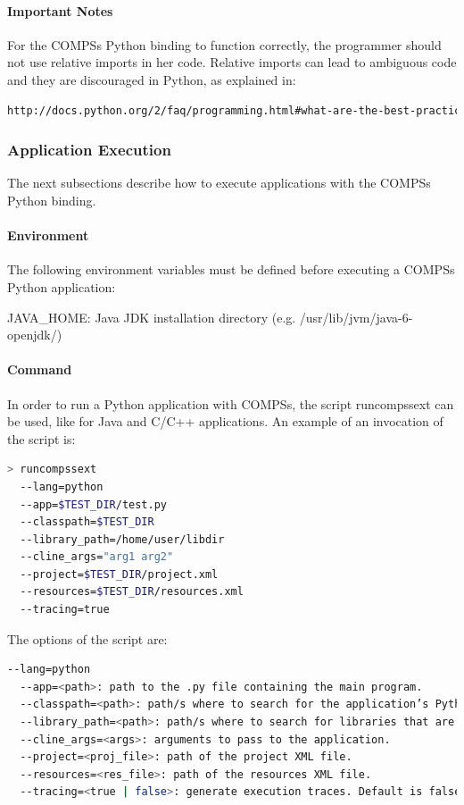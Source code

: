 \paragraph{Important Notes}
For the COMPSs Python binding to function correctly, the programmer should not use relative imports in her code. Relative imports can lead to ambiguous code and they are discouraged in Python, as explained in:

\begin{lstlisting}[language=html]
http://docs.python.org/2/faq/programming.html#what-are-the-best-practices-for-using-import-in-a-module
\end{lstlisting}

\subsubsection{Application Execution}
The next subsections describe how to execute applications with the COMPSs Python binding.

\paragraph{Environment}
The following environment variables must be defined before executing a COMPSs Python application:

JAVA\_HOME: Java JDK installation directory (e.g. /usr/lib/jvm/java-6-openjdk/)

\paragraph{Command}

In order to run a Python application with COMPSs, the script runcompssext can be used, like for Java and C/C++ applications. An example of an invocation of the script is:

\begin{lstlisting}[language=bash]
> runcompssext
  --lang=python
  --app=$TEST_DIR/test.py
  --classpath=$TEST_DIR
  --library_path=/home/user/libdir
  --cline_args="arg1 arg2"
  --project=$TEST_DIR/project.xml
  --resources=$TEST_DIR/resources.xml
  --tracing=true
\end{lstlisting}

The options of the script are:

\begin{lstlisting}[language=bash]
  --lang=python
  --app=<path>: path to the .py file containing the main program.
  --classpath=<path>: path/s where to search for the application’s Python modules. The default value is the current directory.
  --library_path=<path>: path/s where to search for libraries that are not in a standard path. The default value is the variable $LD_LIBRARY_PATH.
  --cline_args=<args>: arguments to pass to the application.
  --project=<proj_file>: path of the project XML file.
  --resources=<res_file>: path of the resources XML file.
  --tracing=<true | false>: generate execution traces. Default is false.
\end{lstlisting}